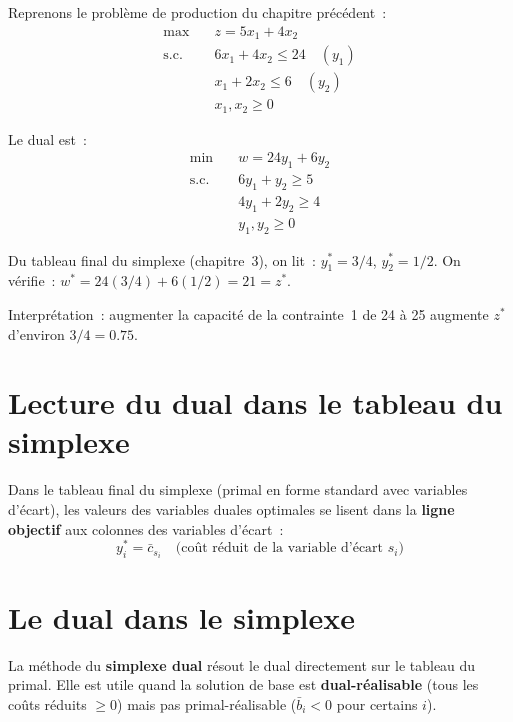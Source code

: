 \begin{exemple}
Reprenons le probl\`eme de production du chapitre pr\'ec\'edent~:
\[
\begin{aligned}
  \max \quad & z = 5x_1 + 4x_2 \\
  \text{s.c.} \quad
    & 6x_1 + 4x_2 \le 24 \quad (y_1) \\
    & x_1 + 2x_2 \le 6 \quad (y_2) \\
    & x_1, x_2 \ge 0
\end{aligned}
\]

Le dual est~:
\[
\begin{aligned}
  \min \quad & w = 24y_1 + 6y_2 \\
  \text{s.c.} \quad
    & 6y_1 + y_2 \ge 5 \\
    & 4y_1 + 2y_2 \ge 4 \\
    & y_1, y_2 \ge 0
\end{aligned}
\]

Du tableau final du simplexe (chapitre~3), on lit~:
$y_1^* = 3/4$, $y_2^* = 1/2$.  On v\'erifie~: $w^* = 24(3/4) + 6(1/2) = 21
= z^*$.

Interpr\'etation~: augmenter la capacit\'e de la contrainte~1 de 24 \`a 25
augmente $z^*$ d'environ $3/4 = 0.75$.
\end{exemple}

\section{Lecture du dual dans le tableau du simplexe}

\begin{proposition}
Dans le tableau final du simplexe (primal en forme standard avec variables
d'\'ecart), les valeurs des variables duales optimales se lisent dans la
\textbf{ligne objectif} aux colonnes des variables d'\'ecart~:
\[
  y_i^* = \bar{c}_{s_i} \quad \text{(co\^ut r\'eduit de la variable d'\'ecart $s_i$)}
\]
\end{proposition}

\section{Le dual dans le simplexe}

La m\'ethode du \textbf{simplexe dual} r\'esout le dual directement sur le
tableau du primal.  Elle est utile quand la solution de base est
\textbf{dual-r\'ealisable} (tous les co\^uts r\'eduits $\ge 0$) mais pas
primal-r\'ealisable ($\bar{b}_i < 0$ pour certains $i$).


